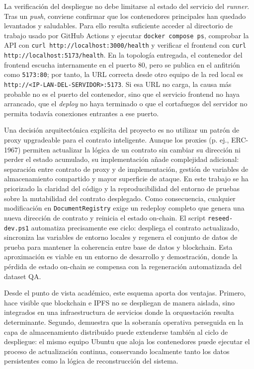 \documentclass[11pt, a4paper]{article}
\begin{document}
La verificación del despliegue no debe limitarse al estado del servicio del \textit{runner}. Tras un \textit{push}, conviene confirmar que los contenedores principales han quedado levantados y saludables. Para ello resulta suficiente acceder al directorio de trabajo usado por GitHub Actions y ejecutar \texttt{docker compose ps}, comprobar la API con \texttt{curl http://localhost:3000/health} y verificar el frontend con \texttt{curl http://localhost:5173/health}. En la topología entregada, el contenedor del frontend escucha internamente en el puerto 80, pero se publica en el anfitrión como \texttt{5173:80}; por tanto, la URL correcta desde otro equipo de la red local es \texttt{http://<IP-LAN-DEL-SERVIDOR>:5173}. Si esa URL no carga, la causa más probable no es el puerto del contenedor, sino que el servicio frontend no haya arrancado, que el \textit{deploy} no haya terminado o que el cortafuegos del servidor no permita todavía conexiones entrantes a ese puerto.

Una decisión arquitectónica explícita del proyecto es no utilizar un patrón de proxy upgradeable para el contrato inteligente. Aunque los proxies (p. ej., ERC-1967) permiten actualizar la lógica de un contrato sin cambiar su dirección ni perder el estado acumulado, su implementación añade complejidad adicional: separación entre contrato de proxy y de implementación, gestión de variables de almacenamiento compartido y mayor superficie de ataque. En este trabajo se ha priorizado la claridad del código y la reproducibilidad del entorno de pruebas sobre la mutabilidad del contrato desplegado. Como consecuencia, cualquier modificación en \texttt{DocumentRegistry} exige un redeploy completo que genera una nueva dirección de contrato y reinicia el estado on-chain. El script \texttt{reseed-dev.ps1} automatiza precisamente ese ciclo: despliega el contrato actualizado, sincroniza las variables de entorno locales y regenera el conjunto de datos de prueba para mantener la coherencia entre base de datos y blockchain. Esta aproximación es viable en un entorno de desarrollo y demostración, donde la pérdida de estado on-chain se compensa con la regeneración automatizada del dataset QA.

Desde el punto de vista académico, este esquema aporta dos ventajas. Primero, hace visible que blockchain e IPFS no se despliegan de manera aislada, sino integrados en una infraestructura de servicios donde la orquestación resulta determinante. Segundo, demuestra que la soberanía operativa perseguida en la capa de almacenamiento distribuido puede extenderse también al ciclo de despliegue: el mismo equipo Ubuntu que aloja los contenedores puede ejecutar el proceso de actualización continua, conservando localmente tanto los datos persistentes como la lógica de reconstrucción del sistema.
\end{document}
